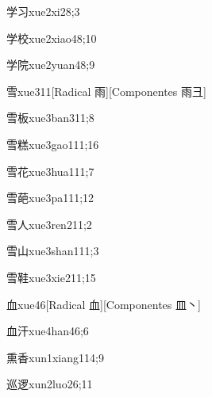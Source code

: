 \begin{verbete}{学习}{xue2xi2}{8;3}
\end{verbete}

\begin{verbete}{学校}{xue2xiao4}{8;10}
\end{verbete}

\begin{verbete}{学院}{xue2yuan4}{8;9}
\end{verbete}

\begin{verbete}{雪}{xue3}{11}[Radical 雨][Componentes 雨彐]
\end{verbete}

\begin{verbete}{雪板}{xue3ban3}{11;8}
\end{verbete}

\begin{verbete}{雪糕}{xue3gao1}{11;16}
\end{verbete}

\begin{verbete}{雪花}{xue3hua1}{11;7}
\end{verbete}

\begin{verbete}{雪葩}{xue3pa1}{11;12}
\end{verbete}

\begin{verbete}{雪人}{xue3ren2}{11;2}
\end{verbete}

\begin{verbete}{雪山}{xue3shan1}{11;3}
\end{verbete}

\begin{verbete}{雪鞋}{xue3xie2}{11;15}
\end{verbete}

\begin{verbete}{血}{xue4}{6}[Radical 血][Componentes 皿丶]
\end{verbete}

\begin{verbete}{血汗}{xue4han4}{6;6}
\end{verbete}

\begin{verbete}{熏香}{xun1xiang1}{14;9}
\end{verbete}

\begin{verbete}{巡逻}{xun2luo2}{6;11}
\end{verbete}

